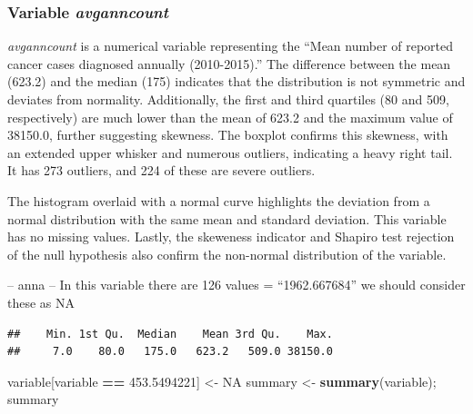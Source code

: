 \documentclass[
]{article}
\newenvironment{Shaded}{\begin{snugshade}}{\end{snugshade}}
\newcommand{\ConstantTok}[1]{\textcolor[rgb]{0.56,0.35,0.01}{#1}}
\newcommand{\FloatTok}[1]{\textcolor[rgb]{0.00,0.00,0.81}{#1}}
\newcommand{\FunctionTok}[1]{\textcolor[rgb]{0.13,0.29,0.53}{\textbf{#1}}}
\newcommand{\NormalTok}[1]{#1}
\newcommand{\OtherTok}[1]{\textcolor[rgb]{0.56,0.35,0.01}{#1}}
\newcommand{\SpecialCharTok}[1]{\textcolor[rgb]{0.81,0.36,0.00}{\textbf{#1}}}
\begin{document}
\subsubsection{\texorpdfstring{Variable
\emph{avganncount}}{Variable avganncount}}\label{variable-avganncount}

\emph{avganncount} is a numerical variable representing the ``Mean
number of reported cancer cases diagnosed annually (2010-2015).'' The
difference between the mean (623.2) and the median (175) indicates that
the distribution is not symmetric and deviates from normality.
Additionally, the first and third quartiles (80 and 509, respectively)
are much lower than the mean of 623.2 and the maximum value of 38150.0,
further suggesting skewness. The boxplot confirms this skewness, with an
extended upper whisker and numerous outliers, indicating a heavy right
tail. It has 273 outliers, and 224 of these are severe outliers.

The histogram overlaid with a normal curve highlights the deviation from
a normal distribution with the same mean and standard deviation. This
variable has no missing values. Lastly, the skeweness indicator and
Shapiro test rejection of the null hypothesis also confirm the
non-normal distribution of the variable.

-- anna -- In this variable there are 126 values = ``1962.667684'' we
should consider these as NA

\begin{Shaded}
\end{Shaded}

\begin{verbatim}
##    Min. 1st Qu.  Median    Mean 3rd Qu.    Max. 
##     7.0    80.0   175.0   623.2   509.0 38150.0
\end{verbatim}

\begin{Shaded}
\begin{Highlighting}[]
\NormalTok{variable[variable }\SpecialCharTok{==} \FloatTok{453.5494221}\NormalTok{] }\OtherTok{\textless{}{-}} \ConstantTok{NA}
\NormalTok{summary }\OtherTok{\textless{}{-}} \FunctionTok{summary}\NormalTok{(variable); summary}
\end{Highlighting}
\end{Shaded}
\end{document}
